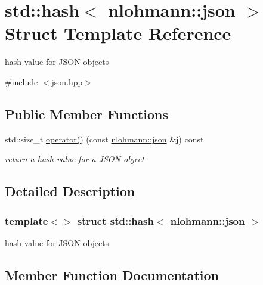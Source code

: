 \hypertarget{structstd_1_1hash_3_01nlohmann_1_1json_01_4}{}\section{std\+:\+:hash$<$ nlohmann\+:\+:json $>$ Struct Template Reference}
\label{structstd_1_1hash_3_01nlohmann_1_1json_01_4}


hash value for J\+S\+ON objects  




{\ttfamily \#include $<$json.\+hpp$>$}

\subsection*{Public Member Functions}
\begin{DoxyCompactItemize}
\item 
std\+::size\+\_\+t \mbox{\hyperlink{structstd_1_1hash_3_01nlohmann_1_1json_01_4_aec1567d1fa47dbe5b77954dce3a55b64}{operator()}} (const \mbox{\hyperlink{namespacenlohmann_a2bfd99e845a2e5cd90aeaf1b1431f474}{nlohmann\+::json}} \&j) const
\begin{DoxyCompactList}\small\item\em return a hash value for a J\+S\+ON object \end{DoxyCompactList}\end{DoxyCompactItemize}


\subsection{Detailed Description}
\subsubsection*{template$<$$>$\newline
struct std\+::hash$<$ nlohmann\+::json $>$}

hash value for J\+S\+ON objects 

\subsection{Member Function Documentation}
\mbox{\label{structstd_1_1hash_3_01nlohmann_1_1json_01_4_aec1567d1fa47dbe5b77954dce3a55b64}} 
